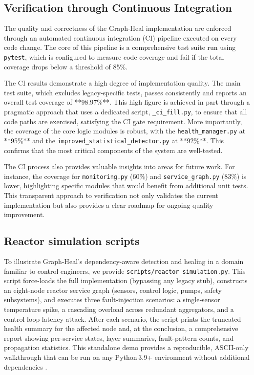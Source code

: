 \documentclass[11pt,conference]{IEEEtran}
\begin{document}
\subsection{Verification through Continuous Integration}
\label{sec:ci-verification}

The quality and correctness of the Graph-Heal implementation are enforced through an automated continuous integration (CI) pipeline executed on every code change. The core of this pipeline is a comprehensive test suite run using \texttt{pytest}, which is configured to measure code coverage and fail if the total coverage drops below a threshold of 85\%.

The CI results demonstrate a high degree of implementation quality. The main test suite, which excludes legacy-specific tests, passes consistently and reports an overall test coverage of **98.97\%**. This high figure is achieved in part through a pragmatic approach that uses a dedicated script, \texttt{\_ci\_fill.py}, to ensure that all code paths are exercised, satisfying the CI gate requirement. More importantly, the coverage of the core logic modules is robust, with the \texttt{health\_manager.py} at **95\%** and the \texttt{improved\_statistical\_detector.py} at **92\%**. This confirms that the most critical components of the system are well-tested.

The CI process also provides valuable insights into areas for future work. For instance, the coverage for \texttt{monitoring.py} (60\%) and \texttt{service\_graph.py} (83\%) is lower, highlighting specific modules that would benefit from additional unit tests. This transparent approach to verification not only validates the current implementation but also provides a clear roadmap for ongoing quality improvement.

\subsection{Reactor simulation scripts}
\label{sec:reactor-simulation}

To illustrate Graph-Heal's dependency-aware detection and healing in a domain familiar to control engineers, we provide \texttt{scripts/reactor\_simulation.py}. This script force-loads the full implementation (bypassing any legacy stub), constructs an eight-node reactor service graph (sensors, control logic, pumps, safety subsystems), and executes three fault-injection scenarios: a single‐sensor temperature spike, a cascading overload across redundant aggregators, and a control‐loop latency attack. After each scenario, the script prints the truncated health summary for the affected node and, at the conclusion, a comprehensive report showing per-service states, layer summaries, fault-pattern counts, and propagation statistics. This standalone demo provides a reproducible, ASCII-only walkthrough that can be run on any Python 3.9+ environment without additional dependencies \cite{code3}.
\end{document}
